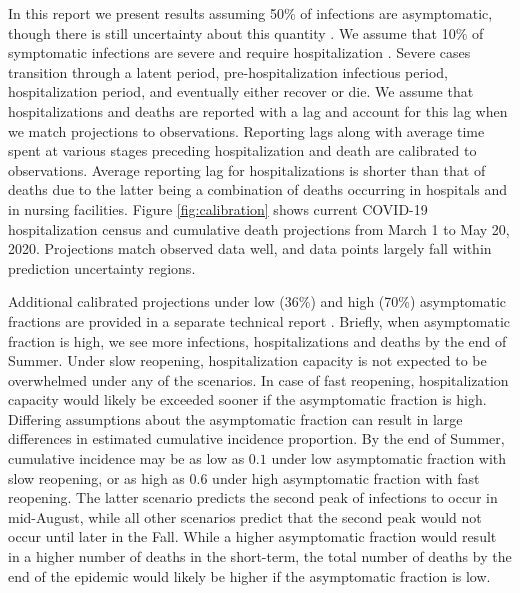 \documentclass[11pt]{article}
\begin{document}
In this report we present results assuming 50\% of infections are asymptomatic, though there is still uncertainty about this quantity \citep{he2020estimation, nishiura2020estimation, mizumoto2020estimating, emery2020contribution, lavezzo2020suppression, campbell2020prevalence}.  We assume that 10\% of symptomatic infections are severe and require hospitalization \citep{verity2020estimates, bi2020epidemiology, salje2020estimating, lane2020country}.  Severe cases transition through a latent period, pre-hospitalization infectious period, hospitalization period, and eventually either recover or die. We assume that hospitalizations and deaths are reported with a lag and account for this lag when we match projections to observations. Reporting lags along with average time spent at various stages preceding hospitalization and death are calibrated to observations. Average reporting lag for hospitalizations is shorter than that of deaths due to the latter being a combination of deaths occurring in hospitals and in nursing facilities.  Figure \ref{fig:calibration} shows current COVID-19 hospitalization census and cumulative death projections from March 1 to May 20, 2020.  Projections match observed data well, and data points largely fall within prediction uncertainty regions.  

Additional calibrated projections under low (36\%) and high (70\%) asymptomatic fractions are provided in a separate technical report \citep{morozova2020tech}.  Briefly, when asymptomatic fraction is high, we see more infections, hospitalizations and deaths by the end of Summer.  Under slow reopening, hospitalization capacity is not expected to be overwhelmed under any of the scenarios.  In case of fast reopening, hospitalization capacity would likely be exceeded sooner if the asymptomatic fraction is high. Differing assumptions about the asymptomatic fraction can result in large differences in estimated cumulative incidence proportion.  By the end of Summer, cumulative incidence may be as low as $0.1$ under low asymptomatic fraction with slow reopening, or as high as $0.6$ under high asymptomatic fraction with fast reopening. The latter scenario predicts the second peak of infections to occur in mid-August, while all other scenarios predict that the second peak would not occur until later in the Fall. While a higher asymptomatic fraction would result in a higher number of deaths in the short-term, the total number of deaths by the end of the epidemic would likely be higher if the asymptomatic fraction is low. 
\end{document}
